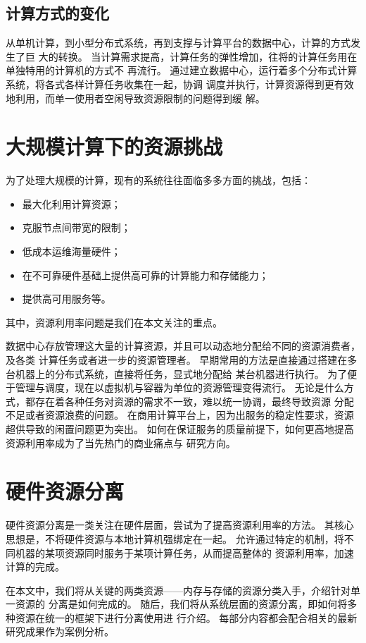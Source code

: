 \subsection{计算方式的变化}

从单机计算，到小型分布式系统，再到支撑与计算平台的数据中心，计算的方式发生了巨
大的转换。
当计算需求提高，计算任务的弹性增加，往将的计算任务用在单独特用的计算机的方式不
再流行。
通过建立数据中心，运行着多个分布式计算系统，将各式各样计算任务收集在一起，协调
调度并执行，计算资源得到更有效地利用，而单一使用者空闲导致资源限制的问题得到缓
解。

\section{大规模计算下的资源挑战}

为了处理大规模的计算，现有的系统往往面临多多方面的挑战，包括：
\begin{itemize}
    \item
    最大化利用计算资源；
    \item
    克服节点间带宽的限制；
    \item 
    低成本运维海量硬件；
    \item
    在不可靠硬件基础上提供高可靠的计算能力和存储能力；
    \item
    提供高可用服务等。
\end{itemize}

其中，资源利用率问题是我们在本文关注的重点。

数据中心存放管理这大量的计算资源，并且可以动态地分配给不同的资源消费者，及各类
计算任务或者进一步的资源管理者\cite{zhang2010cloud}。
早期常用的方法是直接通过搭建在多台机器上的分布式系统，直接将任务，显式地分配给
某台机器进行执行。
为了便于管理与调度，现在以虚拟机与容器为单位的资源管理变得流行。
无论是什么方式，都存在着各种任务对资源的需求不一致，难以统一协调，最终导致资源
分配不足或者资源浪费的问题。
在商用计算平台上，因为出服务的稳定性要求，资源超供导致的闲置问题更为突出。
如何在保证服务的质量前提下，如何更高地提高资源利用率成为了当先热门的商业痛点与
研究方向。

\section{硬件资源分离}

硬件资源分离是一类关注在硬件层面，尝试为了提高资源利用率的方法。
其核心思想是，不将硬件资源与本地计算机强绑定在一起。
允许通过特定的机制，将不同机器的某项资源同时服务于某项计算任务，从而提高整体的
资源利用率，加速计算的完成。

在本文中，我们将从关键的两类资源——内存与存储的资源分类入手，介绍针对单一资源的
分离是如何完成的。
随后，我们将从系统层面的资源分离，即如何将多种资源在统一的框架下进行分离使用进
行介绍。
每部分内容都会配合相关的最新研究成果作为案例分析。